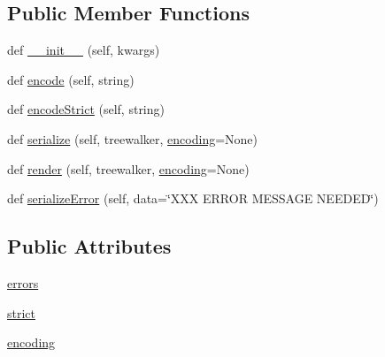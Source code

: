 \subsection*{Public Member Functions}
\begin{DoxyCompactItemize}
\item 
def \hyperlink{classpip_1_1__vendor_1_1html5lib_1_1serializer_1_1HTMLSerializer_a0eb882551ec9de864f4d62278f922082}{\+\_\+\+\_\+init\+\_\+\+\_\+} (self, kwargs)
\item 
def \hyperlink{classpip_1_1__vendor_1_1html5lib_1_1serializer_1_1HTMLSerializer_abd4ec299ae81add037a31df220eb9e6f}{encode} (self, string)
\item 
def \hyperlink{classpip_1_1__vendor_1_1html5lib_1_1serializer_1_1HTMLSerializer_a05ecfa5b96a086e6d65e756184e1b817}{encode\+Strict} (self, string)
\item 
def \hyperlink{classpip_1_1__vendor_1_1html5lib_1_1serializer_1_1HTMLSerializer_a307cfabfce14ef279b3aba85ea81d4d7}{serialize} (self, treewalker, \hyperlink{classpip_1_1__vendor_1_1html5lib_1_1serializer_1_1HTMLSerializer_a935f881ba89e5a6726dfaab82d6c3d18}{encoding}=None)
\item 
def \hyperlink{classpip_1_1__vendor_1_1html5lib_1_1serializer_1_1HTMLSerializer_a24277c42df8722ba57624ed6dcedc6ea}{render} (self, treewalker, \hyperlink{classpip_1_1__vendor_1_1html5lib_1_1serializer_1_1HTMLSerializer_a935f881ba89e5a6726dfaab82d6c3d18}{encoding}=None)
\item 
def \hyperlink{classpip_1_1__vendor_1_1html5lib_1_1serializer_1_1HTMLSerializer_ae158300cb519b4174210990497140ae9}{serialize\+Error} (self, data=\char`\"{}X\+XX E\+R\+R\+OR M\+E\+S\+S\+A\+GE N\+E\+E\+D\+ED\char`\"{})
\end{DoxyCompactItemize}
\subsection*{Public Attributes}
\begin{DoxyCompactItemize}
\item 
\hyperlink{classpip_1_1__vendor_1_1html5lib_1_1serializer_1_1HTMLSerializer_a628280128c2b57ea72a6e3651deb5187}{errors}
\item 
\hyperlink{classpip_1_1__vendor_1_1html5lib_1_1serializer_1_1HTMLSerializer_ab7901239aa1155791f9b1be211e845ca}{strict}
\item 
\hyperlink{classpip_1_1__vendor_1_1html5lib_1_1serializer_1_1HTMLSerializer_a935f881ba89e5a6726dfaab82d6c3d18}{encoding}
\end{DoxyCompactItemize}
